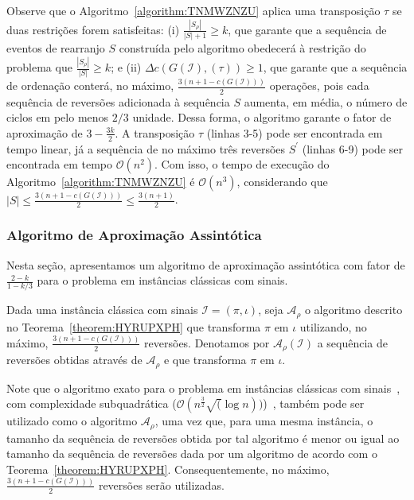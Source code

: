 Observe que o Algoritmo~\ref{algorithm:TNMWZNZU} aplica uma transposição $\tau$ se duas restrições forem satisfeitas: (i) $\frac{|S_{\rho}|}{|S| + 1} \ge k$, que garante que a sequência de eventos de rearranjo $S$ construída pelo algoritmo obedecerá à restrição do problema que $\frac{|S_{\rho}|}{|S|} \ge k$; e (ii) $\Delta c(G(\mathcal{I}), (\tau)) \ge 1$, que garante que a sequência de ordenação conterá, no máximo, $\frac{3(n + 1 -c(G(\mathcal{I})))}{2}$ operações, pois cada sequência de reversões adicionada à sequência $S$ aumenta, em média, o número de ciclos em pelo menos $2/3$ unidade. Dessa forma, o algoritmo garante o fator de aproximação de $3-\frac{3k}{2}$. A transposição $\tau$ (linhas 3-5) pode ser encontrada em tempo linear, já a sequência de no máximo três reversões $S^{\prime}$ (linhas 6-9) pode ser encontrada em tempo $\mathcal{O}(n^2)$. Com isso, o tempo de execução do Algoritmo~\ref{algorithm:TNMWZNZU} é $\mathcal{O}(n^3)$, considerando que $|S| \le \frac{3(n + 1 -c(G(\mathcal{I})))}{2} \le \frac{3({n+1})}{2}$.

\subsubsection{Algoritmo de Aproximação Assintótica}

Nesta seção, apresentamos um algoritmo de aproximação assintótica com fator de $\frac{2-k}{1-k/3}$ para o problema \SbPRT{} em instâncias clássicas com sinais.

\begin{definition}
Dada uma instância clássica com sinais $\mathcal{I} = (\pi,\iota)$, seja $\mathcal{A}_\rho$ o algoritmo descrito no Teorema~\ref{theorem:HYRUPXPH} que transforma $\pi$ em $\iota$ utilizando, no máximo, $\frac{3(n + 1 -c(G(\mathcal{I})))}{2}$ reversões. Denotamos por $\mathcal{A}_\rho(\mathcal{I})$ a sequência de reversões obtidas através de $\mathcal{A}_\rho$ e que transforma $\pi$ em $\iota$.
\end{definition}

Note que o algoritmo exato para o problema \SbR{} em instâncias clássicas com sinais~\cite{1999-hannenhalli-pevzner}, com complexidade subquadrática ($\mathcal{O}(n^{\frac{3}{2}}\sqrt(\log n))$)~\cite{2007-tannier-etal}, também pode ser utilizado como o algoritmo $\mathcal{A}_\rho$, uma vez que, para uma mesma instância, o tamanho da sequência de reversões obtida por tal algoritmo é menor ou igual ao tamanho da sequência de reversões dada por um algoritmo de acordo com o Teorema~\ref{theorem:HYRUPXPH}. Consequentemente, no máximo, $\frac{3(n + 1 -c(G(\mathcal{I})))}{2}$ reversões serão utilizadas.

